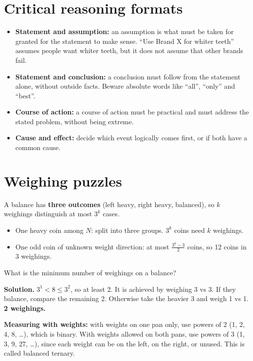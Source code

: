 \documentclass[11pt,a4paper,openany]{report}
\begin{document}
\section{Critical reasoning formats}
\begin{itemize}
\item \textbf{Statement and assumption:} an assumption is what must be taken for granted for the statement to make sense. ``Use Brand X for whiter teeth'' assumes people want whiter teeth, but it does not assume that other brands fail.
\item \textbf{Statement and conclusion:} a conclusion must follow from the statement alone, without outside facts. Beware absolute words like ``all'', ``only'' and ``best''.
\item \textbf{Course of action:} a course of action must be practical and must address the stated problem, without being extreme.
\item \textbf{Cause and effect:} decide which event logically comes first, or if both have a common cause.
\end{itemize}

\section{Weighing puzzles}
\begin{idea}
A balance has \textbf{three outcomes} (left heavy, right heavy, balanced), so $k$ weighings distinguish at most $3^k$ cases.
\begin{itemize}[nosep]
\item One heavy coin among $N$: split into three groups. $3^k$ coins need $k$ weighings.
\item One odd coin of unknown weight direction: at most $\frac{3^k-3}2$ coins, so 12 coins in 3 weighings.
\end{itemize}
\end{idea}

\begin{example}
What is the minimum number of weighings on a balance?

\textbf{Solution.} $3^1<8\le3^2$, so at least 2. It is achieved by weighing 3 vs 3. If they balance, compare the remaining 2. Otherwise take the heavier 3 and weigh 1 vs 1. \textbf{2 weighings.}
\end{example}

\textbf{Measuring with weights:} with weights on one pan only, use powers of 2 (1, 2, 4, 8, \dots), which is binary. With weights allowed on both pans, use powers of 3 (1, 3, 9, 27, \dots), since each weight can be on the left, on the right, or unused. This is called balanced ternary.
\end{document}
